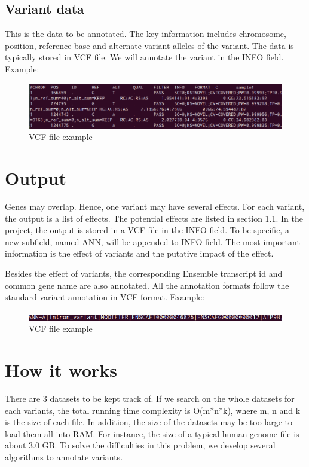\documentclass[onehalf,11pt]{beavtex}
\begin{document}
\subsection{Variant data}
This is the data to be annotated. The key information includes chromosome, position, reference base and alternate variant alleles of the variant. The data is typically stored in VCF file. We will annotate the variant in the INFO field. Example:
\begin{figure}[!ht]
\centering
\includegraphics[scale=0.6]{./pic/vcf.png}
\caption{VCF file example}
\end{figure}


\section{Output}
Genes may overlap. Hence, one variant may have several effects. For each variant, the output is a list of effects. The potential effects are listed in section 1.1. In the project, the output is stored in a VCF file in the INFO field. To be specific, a new subfield, named ANN, will be appended to INFO field. The most important information is the effect of variants and the putative impact of the effect.

Besides the effect of variants, the corresponding Ensemble transcript id and common gene name are also annotated. All the annotation formats follow the standard variant annotation in VCF format. Example:
\begin{figure}[!ht]
\centering
\includegraphics[scale=0.7]{./pic/ann.png}
\caption{VCF file example}
\end{figure}

\section{How it works}
There are 3 datasets to be kept track of. If we search on the whole datasets for each variants, the total running time complexity is O(m*n*k), where m, n and k is the size of each file. In addition, the size of the datasets may be too large to load them all into RAM. For instance, the size of a typical human genome file is about 3.0 GB. To solve the difficulties in this problem, we develop several algorithms to annotate variants.
\end{document}
